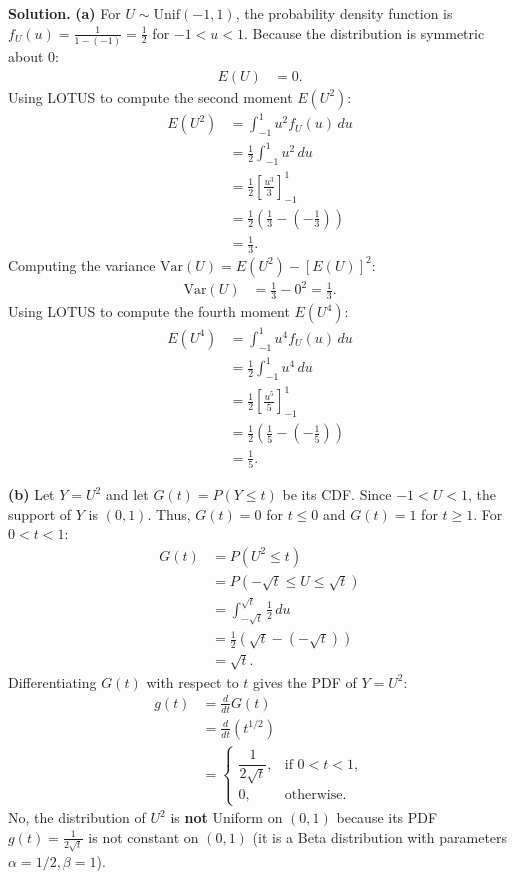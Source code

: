 \documentclass[11pt,a4paper]{article}
\begin{document}
\noindent \textbf{Solution.} \textbf{(a)} For $U \sim \text{Unif}(-1, 1)$, the probability density function is $f_U(u) = \frac{1}{1 - (-1)} = \frac{1}{2}$ for $-1 < u < 1$. Because the distribution is symmetric about $0$:
\begin{align*}
E(U) &= 0.
\end{align*}
Using LOTUS to compute the second moment $E(U^2)$:
\begin{align*}
E(U^2) &= \int_{-1}^{1} u^2 f_U(u) \, du \\
&= \frac{1}{2} \int_{-1}^{1} u^2 \, du \\
&= \frac{1}{2} \left[ \frac{u^3}{3} \right]_{-1}^{1} \\
&= \frac{1}{2} \left( \frac{1}{3} - \left(-\frac{1}{3}\right) \right) \\
&= \frac{1}{3}.
\end{align*}
Computing the variance $\text{Var}(U) = E(U^2) - [E(U)]^2$:
\begin{align*}
\text{Var}(U) &= \frac{1}{3} - 0^2 = \frac{1}{3}.
\end{align*}
Using LOTUS to compute the fourth moment $E(U^4)$:
\begin{align*}
E(U^4) &= \int_{-1}^{1} u^4 f_U(u) \, du \\
&= \frac{1}{2} \int_{-1}^{1} u^4 \, du \\
&= \frac{1}{2} \left[ \frac{u^5}{5} \right]_{-1}^{1} \\
&= \frac{1}{2} \left( \frac{1}{5} - \left(-\frac{1}{5}\right) \right) \\
&= \frac{1}{5}.
\end{align*}

\vspace{4pt}
\noindent \textbf{(b)} Let $Y = U^2$ and let $G(t) = P(Y \le t)$ be its CDF. Since $-1 < U < 1$, the support of $Y$ is $(0, 1)$. Thus, $G(t) = 0$ for $t \le 0$ and $G(t) = 1$ for $t \ge 1$. For $0 < t < 1$:
\begin{align*}
G(t) &= P(U^2 \le t) \\
&= P(-\sqrt{t} \le U \le \sqrt{t}) \\
&= \int_{-\sqrt{t}}^{\sqrt{t}} \frac{1}{2} \, du \\
&= \frac{1}{2} \left( \sqrt{t} - (-\sqrt{t}) \right) \\
&= \sqrt{t}.
\end{align*}
Differentiating $G(t)$ with respect to $t$ gives the PDF of $Y = U^2$:
\begin{align*}
g(t) &= \frac{d}{dt} G(t) \\
&= \frac{d}{dt} \left( t^{1/2} \right) \\
&= \begin{cases}
\dfrac{1}{2\sqrt{t}}, & \text{if } 0 < t < 1, \\[6pt]
0, & \text{otherwise}.
\end{cases}
\end{align*}
No, the distribution of $U^2$ is \textbf{not} Uniform on $(0, 1)$ because its PDF $g(t) = \frac{1}{2\sqrt{t}}$ is not constant on $(0, 1)$ (it is a Beta distribution with parameters $\alpha = 1/2, \beta = 1$).
\end{document}

